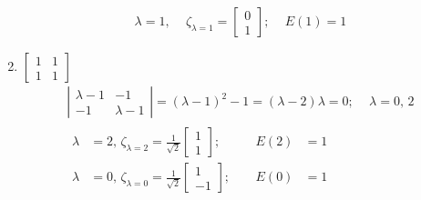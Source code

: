 \documentclass[twoside]{amsart}
\theoremstyle{plain}
\theoremstyle{definition}
\begin{document}
\begin{enumerate}
\[\begin{gathered}
  \boxed{ \lambda =1, \quad \, \zeta_{\lambda =1 } = \left[ \begin{matrix} 0 \\ 1 \end{matrix} \right]; \quad \, E(1) = 1 }
\end{gathered}
\]
\item $\left[ \begin{matrix} 1 & 1 \\ 1 & 1 \end{matrix} \right]$
\[
\begin{gathered}
  \left| \begin{matrix} \lambda - 1 & -1 \\ -1 & \lambda - 1 \end{matrix} \right| = (\lambda -1)^2 - 1 = (\lambda -2)\lambda = 0 ; \quad \, \lambda = 0, \, 2 \\
  \begin{aligned} \lambda & = 2, \, \zeta_{\lambda =2 } = \frac{1}{\sqrt{2}} \left[ \begin{matrix} 1 \\ 1 \end{matrix} \right]; \quad \, & E(2) & = 1 \\ 
    \lambda & = 0, \, \zeta_{\lambda =0} = \frac{1}{\sqrt{2}} \left[ \begin{matrix} 1 \\ -1 \end{matrix} \right]; \quad \, & E(0) & =1 \end{aligned}
\end{gathered}
\]
\end{enumerate}
\end{document}
